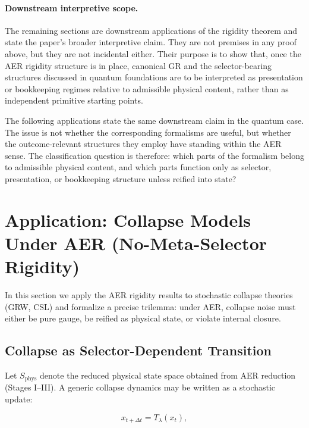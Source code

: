 \documentclass[11pt]{article}
\theoremstyle{remark}
\theoremstyle{plain}
\begin{document}
\paragraph{Downstream interpretive scope.}
The remaining sections are downstream applications of the rigidity theorem and state the paper's broader interpretive claim. They are not premises in any proof above, but they are not incidental either. Their purpose is to show that, once the AER rigidity structure is in place, canonical GR and the selector-bearing structures discussed in quantum foundations are to be interpreted as presentation or bookkeeping regimes relative to admissible physical content, rather than as independent primitive starting points.


The following applications state the same downstream claim in the quantum case.
The issue is not whether the corresponding formalisms are useful, but whether the outcome-relevant structures they employ have standing within the AER sense. The classification question is therefore: which parts of the formalism belong to admissible physical content, and which parts function only as selector, presentation, or bookkeeping structure unless reified into state?

\section{Application: Collapse Models Under AER (No-Meta-Selector Rigidity)}
\label{sec:collapse}

In this section we apply the AER rigidity results to stochastic collapse theories 
(GRW, CSL) and formalize a precise trilemma: under AER, collapse noise must either 
be pure gauge, be reified as physical state, or violate internal closure.

\subsection{Collapse as Selector-Dependent Transition}

Let $S_{\mathrm{phys}}$ denote the reduced physical state space obtained 
from AER reduction (Stages I--III). 
A generic collapse dynamics may be written as a stochastic update:

\begin{equation}
x_{t+\Delta t} = T_{\lambda}(x_t),
\end{equation}
\end{document}
